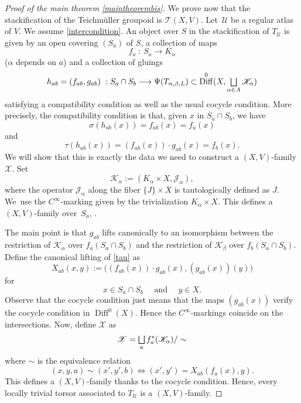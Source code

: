 \documentclass[JEP,XML,SOM,Unicode]{cedram}
\let\mathcal\mathscr
\let\oldbigsqcup\bigsqcup
\renewcommand{\bigsqcup}{\mathop{\textstyle\oldbigsqcup}\displaylimits}
\DeclareMathOperator{\Diff}{Diff}
\theoremstyle{plain}
\theoremstyle{definition}
\theoremstyle{remark}
\numberwithin{equation}{section}
\newcommand{\DK}{\Diff^0(X,\bigsqcup_{\alpha\in A}\mathcal K_\alpha)}
\let\uniondisjointe\bigsqcup
\begin{document}
\begin{proof}[Proof of the main theorem \ref{maintheorembis}]
We prove now that the stackification of the Teichmüller groupoid is $\mathcal T(X,V)$.
Let~$\mathcal U$ be a regular atlas of $V$.
We assume \eqref{intercondition}.
An object over $S$ in the stackification of $T_{\mathcal U}$ is given by an open covering $(S_a)$ of $S$, a collection of maps
\begin{equation}
\label{fa}
f_a \ :\ S_a\longrightarrow K_{\alpha}
\end{equation}
($\alpha$ depends on $a$) and a collection of gluings
\begin{equation}
\label{hab}
h_{ab}=(f_{ab},g_{ab})\ : S_a\cap S_b \longrightarrow \Psi(T_{\alpha, \beta, L})\subset \DK
\end{equation}
satisfying a compatibility condition as well as the usual cocycle condition. More precisely, the compatibility condition is that,
given $x$ in $S_a\cap S_b$, we have
\begin{equation}
\label{sigma}
\sigma (h_{ab}(x))=f_{ab}(x)=f_a(x)
\end{equation}
and
\begin{equation}
\label{tau}
\tau(h_{ab}(x))=( f_{ab}(x))\cdot g_{ab}(x)=f_b(x).
\end{equation}
We will show that this is exactly the data we need to construct a $(X,V)$-family $\mathcal X$. Set
\begin{equation}
\label{XV1}
\mathcal K_{\alpha}:=(K_{\alpha}\times X, \mathcal J_\alpha),
\end{equation}
where the operator $\mathcal J_\alpha$ along the fiber $\{J\}\times X$ is tautologically defined as $J$. We~use the $C^\infty$-marking given by the trivialization $K_\alpha\times X$. This defines a $(X, V)$-family over~$S_a$, \cf \cite{Ku3}.

The main point is that $g_{ab}$ lifts canonically to an isomorphism between the restriction of $\mathcal K_{\alpha}$ over $f_a(S_a\cap S_b)$ and the restriction of $\mathcal K_{\beta}$ over $f_b(S_a\cap S_b)$. Define the canonical lifting of \eqref{tau} as
\begin{equation}
\label{clifting}
X_{ab}(x,y):=\big (( f_{ab}(x))\cdot g_{ab}(x),(g_{ab}(x))(y)\big )
\end{equation}
for
\begin{equation}
\label{liftingcond}
x\in S_a\cap S_b\quad\text{ and }\quad y\in X.
\end{equation}
Observe that the cocycle condition just means that the maps
$(g_{ab}(x))$
verify the cocycle condition in $\Diff^0(X)$. Hence the $C^\infty$-markings coincide on the intersections. Now, define $\mathcal X$ as
\begin{equation}
\label{defX}
\mathcal X=\uniondisjointe_a f_a^*(\mathcal K_{\alpha})/\sim
\end{equation}
where $\sim$ is the equivalence relation
\begin{equation}
\label{XVequiv}
(x,y,a)\sim (x',y',b)\iff (x',y')=X_{ab}(f_a(x),y).
\end{equation}
This defines a $(X,V)$-family thanks to the cocycle condition. Hence, every locally trivial torsor associated to $T_{\mathcal U}$ is a $(X,V)$-family.


\end{proof}
\end{document}
